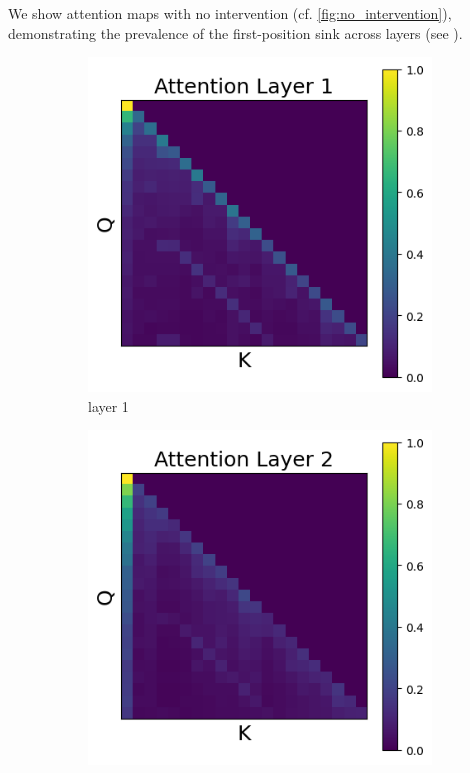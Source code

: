 \documentclass[11pt]{article}
\begin{document}
We show attention maps with no intervention (cf. \cref{fig:no_intervention}), demonstrating the prevalence of the first-position sink across layers (see ).
\begin{figure}[t]
  \begin{subfigure}[t]{0.24\textwidth}
    \centering
    \includegraphics[width=1.4\columnwidth]{figures/no_intervention/layer_1.png}
    \caption{layer 1}
  \end{subfigure}\hfill
  \begin{subfigure}[t]{0.24\textwidth}
    \centering
    \includegraphics[width=1.4\columnwidth]{figures/no_intervention/layer_2.png}

\end{subfigure}
\end{figure}
\end{document}
